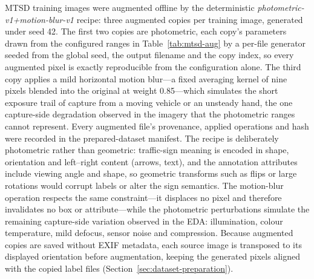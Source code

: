 MTSD training images were augmented offline by the deterministic \emph{photometric-v1+motion-blur-v1} recipe: three augmented copies per training image, generated under seed 42. The first two copies are photometric, each copy's parameters drawn from the configured ranges in Table~\ref{tab:mtsd-aug} by a per-file generator seeded from the global seed, the output filename and the copy index, so every augmented pixel is exactly reproducible from the configuration alone. The third copy applies a mild horizontal motion blur---a fixed averaging kernel of nine pixels blended into the original at weight 0.85---which simulates the short exposure trail of capture from a moving vehicle or an unsteady hand, the one capture-side degradation observed in the imagery that the photometric ranges cannot represent. Every augmented file's provenance, applied operations and hash were recorded in the prepared-dataset manifest. The recipe is deliberately photometric rather than geometric: traffic-sign meaning is encoded in shape, orientation and left--right content (arrows, text), and the annotation attributes include viewing angle and shape, so geometric transforms such as flips or large rotations would corrupt labels or alter the sign semantics. The motion-blur operation respects the same constraint---it displaces no pixel and therefore invalidates no box or attribute---while the photometric perturbations simulate the remaining capture-side variation observed in the EDA: illumination, colour temperature, mild defocus, sensor noise and compression. Because augmented copies are saved without EXIF metadata, each source image is transposed to its displayed orientation before augmentation, keeping the generated pixels aligned with the copied label files (Section~\ref{sec:dataset-preparation}).

